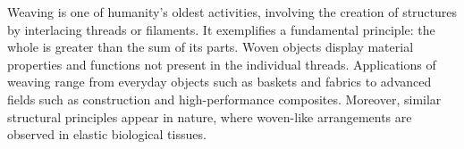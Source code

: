 

Weaving is one of humanity’s oldest activities, involving the creation of structures by interlacing threads or filaments. It exemplifies a fundamental principle: the whole is greater than the sum of its parts. Woven objects display material properties and functions not present in the individual threads. Applications of weaving range from everyday objects such as baskets and fabrics to advanced fields such as construction and high-performance composites. Moreover, similar structural principles appear in nature, where woven-like arrangements are observed in elastic biological tissues.

